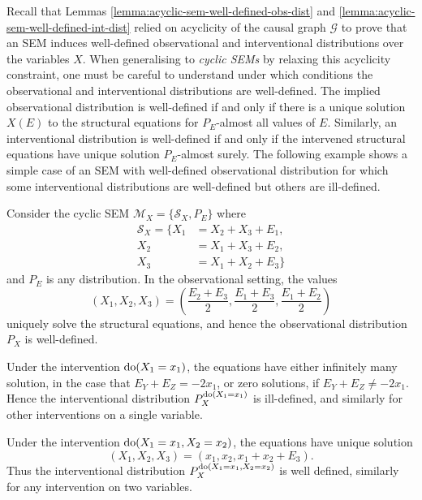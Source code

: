 Recall that Lemmas \ref{lemma:acyclic-sem-well-defined-obs-dist} and \ref{lemma:acyclic-sem-well-defined-int-dist} relied on acyclicity of the causal graph $\mathcal{G}$ to prove that an SEM induces well-defined observational and interventional distributions over the variables $X$. 
When generalising to \emph{cyclic SEMs} by relaxing this acyclicity constraint, one must be careful to understand under which conditions the observational and interventional distributions are well-defined.
The implied observational distribution is well-defined if and only if there is a unique solution $X(E)$ to the structural equations for $P_E$-almost all values of $E$. Similarly, an interventional distribution is well-defined if and only if the intervened structural equations have unique solution $P_E$-almost surely.
The following example shows a simple case of an SEM with well-defined observational distribution for which some interventional distributions are well-defined but others are ill-defined.

\medskip

\begin{example}\label{example:causality-cyclic-invalid}
Consider the cyclic SEM $\mathcal{M}_X=\{\mathcal{S}_X, P_E\}$ where
%
\begin{align*}
\mathcal{S}_X = \big\{  X_1 &= X_2 + X_3 + E_1, \\
					    X_2 &= X_1 + X_3 + E_2, \\
					    X_3 &= X_1 + X_2 + E_3\big\}
\end{align*}
%
and $P_E$ is any distribution.
In the observational setting, the values 
\[(X_1, X_2, X_3) = \left(\frac{E_2 + E_3}{2}, \frac{E_1 + E_3}{2}, \frac{E_1 + E_2}{2}\right)\]
uniquely solve the structural equations, and hence the observational distribution $P_X$ is well-defined. 

Under the intervention $\operatorname{do}(X_1 = x_1)$, the equations have either infinitely many solution, in the case that $E_Y + E_Z = -2 x_1$, or zero solutions, if $E_Y + E_Z \not= -2 x_1$. 
Hence the interventional distribution $P_X^{\operatorname{do}(X_1 = x_1)}$ is ill-defined, and similarly for other interventions on a single variable.

Under the intervention $\operatorname{do}(X_1=x_1, X_2=x_2)$, the equations have unique solution 
\[(X_1, X_2, X_3) = \left(x_1, x_2, x_1 + x_2 + E_3 \right).\]
Thus the interventional distribution $P_X^{\operatorname{do}(X_1 = x_1, X_2=x_2)}$ is well defined, similarly for any intervention on two variables.
\end{example}

